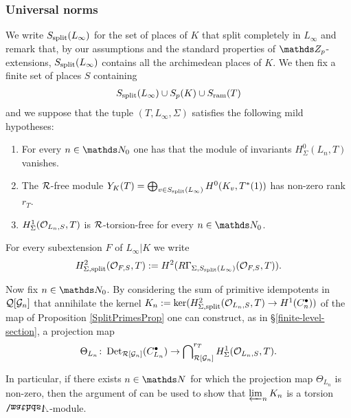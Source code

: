 \documentclass[a4paper, 
headsepline=off, DIV=12, titlepage=false]{scrartcl}
\begin{document}
\tocless\subsubsection{Universal norms}

We write $S_{\mathrm{split}}(L_\infty)$ for the set of places of $K$ that split completely in $L_\infty$ and remark that, by our assumptions and the standard properties of $\ZZ_p$-extensions, $S_{\mathrm{split}}(L_\infty)$ contains all the archimedean places of $K$. We then fix a finite set of places $S$ containing
\begin{align*}
    S_{\mathrm{split}}(L_\infty) \cup S_p(K) \cup S_{\mathrm{ram}}(T)
\end{align*}
and we suppose that the tuple $(T,L_\infty, \Sigma)$ satisfies the following mild hypotheses:

\begin{hypotheses}\label{main-hypothesis-appendix}\text{}
    \begin{enumerate}[label=(\arabic*)]
        \item{For every $n \in \NN_0$ one has that the module of invariants $H^0_\Sigma(L_n, T)$ vanishes.}
        \item{The $\mathcal{R}$-free module $Y_K(T) = \bigoplus_{v \in S_{\mathrm{split}}(L_\infty)} H^0(K_v,T^*(1))$ has non-zero rank $r_T$.}
        \item{$H^1_\Sigma(\mathcal{O}_{L_n, S}, T)$ is $\mathcal{R}$-torsion-free for every $n \in \N_0$}.
    \end{enumerate}
\end{hypotheses}

For every subextension $F$ of $L_\infty | K$ we write
\begin{align*}
    H^2_{\Sigma,\mathrm{split}}(\mathcal{O}_{F, S}, T) := H^2(R\Gamma_{\Sigma, S_{\mathrm{split}}(L_\infty)}(\mathcal{O}_{F,S}, T)).
\end{align*}

Now fix $n \in \NN_0$. By considering the sum of primitive idempotents in $\mathcal{Q}[\mathcal{G}_n]$ that annihilate the kernel $K_n := \ker(H^2_{\Sigma,\mathrm{split}}(\mathcal{O}_{L_n,S}, T) \to H^1(C_n^\bullet))$ of the map of Proposition \ref{SplitPrimesProp} one can construct, as in \S\ref{finite-level-section}, a projection map
\begin{align*}
    \Theta_{L_n} \colon \operatorname{Det}_{\mathcal{R}[\mathcal{G}_n]}(C_{L_n}^\bullet) \to \bigcap\nolimits_{\mathcal{R}[\mathcal{G}_n]}^{r_T} H^1_\Sigma(\mathcal{O}_{L_n,S},T).
\end{align*}

In particular, if there exists $n \in \NN$ for which the projection map $\Theta_{L_n}$ is non-zero, then the argument of \cite[Prop. 4.30(i)]{EulerSystemsSagaIII} can be used to show that $\varprojlim_n K_n$ is a torsion $\bLambda$-module.\\
\end{document}

